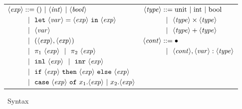 \begin{figure}
\caption{\ellTarget~Syntax}
\label{fig:baseSyntax}
\centering
\begin{tabular}{ll} 
$\begin{aligned}
\expr &::= ()~|~\inte~|~\bool \\
&\gbar \letin{\var}{\expr}{\expr} \\
&\gbar \var \\
&\gbar (\expr, \expr) \\
&\gbar \pi_1~\expr \gbar \pi_2~\expr \\
&\gbar \inl~\expr \gbar \inr~\expr \\
&\gbar \ifthen {\expr}{\expr}{\expr}  \\
&\gbar \caseof {\expr}{x_1.\expr}{x_2.\expr} 
\end{aligned} $
& 
$\begin{aligned}
\type &::=  \rmunit~|~\text{int}~|~\text{bool} \\
&\gbar \type \times \type  \\
&\gbar \type + \type 
\\
\context &::= \emptyC \\
&\gbar \context, \var : \type
\\ \\ \\ \\
\end{aligned} $
\end{tabular}
\end{figure}


